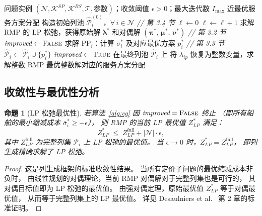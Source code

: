 \documentclass[11pt,a4paper]{article}
\newtheorem{proposition}{命题}
\begin{document}
\begin{algorithm}[htbp]
\caption{列生成求解框架}
\label{alg:cg}
\begin{algorithmic}[1]
\REQUIRE 问题实例 $(\mathcal{N}, \mathcal{K}^{SP}, \mathcal{K}^{BS}, \mathcal{T},
  \text{参数})$；收敛阈值 $\epsilon > 0$；最大迭代数 $I_{\max}$
\ENSURE 近最优服务方案分配
\STATE 构造初始列池 $\hat{\mathcal{P}}_i^{(0)}$，$\forall\, i \in \mathcal{N}$
  \hfill \textit{// 第 3.4 节}
\STATE $\ell \leftarrow 0$
\REPEAT
  \STATE $\ell \leftarrow \ell + 1$
  \STATE 求解 RMP 的 LP 松弛，获得原始解 $\boldsymbol{\lambda}^*$
    和对偶解 $(\boldsymbol{\pi}^*,\, \boldsymbol{\mu}^*,\, \boldsymbol{\nu}^*)$
    \hfill \textit{// 第 3.2 节}
  \STATE $\textit{improved} \leftarrow \textsc{False}$
    \STATE 求解 $\text{PP}_i$：计算 $\bar{\sigma}_i^*$
      及对应最优方案 $p_i^*$
      \hfill \textit{// 第 3.3 节}
      \STATE $\hat{\mathcal{P}}_i \leftarrow \hat{\mathcal{P}}_i \cup \{p_i^*\}$
      \STATE $\textit{improved} \leftarrow \textsc{True}$
    \ENDIF
  \ENDFOR
{}
\STATE 在最终列池 $\hat{\mathcal{P}}_i$ 上
  将 $\lambda_{ip}$ 恢复为整数变量，求解整数 RMP
\RETURN 最优整数解对应的服务方案分配
\end{algorithmic}
\end{algorithm}

\subsection{收敛性与最优性分析}

\begin{proposition}[LP 松弛最优性]
若算法~\ref{alg:cg} 因 $\textit{improved} = \textsc{False}$ 终止
（即所有船舶的最小缩减成本 $\bar{\sigma}_i^* \geq -\epsilon$），
则 RMP 的当前 LP 最优值 $Z_{LP}^*$ 满足：
\begin{equation}
  Z_{LP}^* \;\leq\; Z_{LP}^{\text{full}} + |\mathcal{N}| \cdot \epsilon,
  \tag{37}
\end{equation}
其中 $Z_{LP}^{\text{full}}$ 为完整列集 $\mathcal{P}_i$ 上 LP 松弛的最优值。
当 $\epsilon \to 0$ 时，$Z_{LP}^* = Z_{LP}^{\text{full}}$，
即列生成精确求解了 LP 松弛。
\end{proposition}

\begin{proof}
这是列生成框架的标准收敛性结果。
当所有定价子问题的最优缩减成本非负时，
由线性规划的对偶理论，当前 RMP 对偶解对于完整列集也是可行的，
其对偶目标值即为 LP 松弛的最优值。
由强对偶定理，原始最优值 $Z_{LP}^*$ 等于对偶最优值，
从而等于完整列集上的 LP 最优值。
详见 Desaulniers et al.~\cite{Desaulniers2005}
第 2 章的标准证明。
\end{proof}
\end{document}
